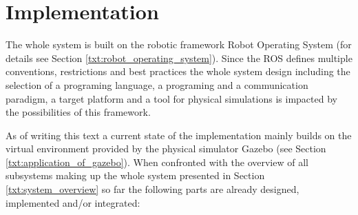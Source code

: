 %
%
%
%
 


\chapter{Implementation} \label{txt:implementation}

The whole system is built on the robotic framework Robot Operating System (for details see Section \ref{txt:robot_operating_system}). Since the ROS defines multiple conventions, restrictions and best practices the whole system design including the selection of a programing language, a programing and a communication paradigm, a target platform and a tool for physical simulations is impacted by the possibilities of this framework.

As of writing this text a current state of the implementation mainly builds on the virtual environment provided by the physical simulator Gazebo (see Section \ref{txt:application_of_gazebo}). When confronted with the overview of all subsystems making up the whole system presented in Section \ref{txt:system_overview} so far the following parts are already designed, implemented and/or integrated:

